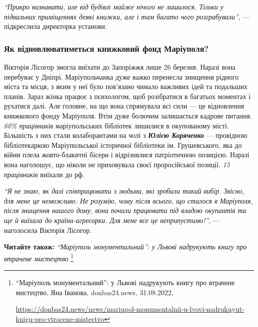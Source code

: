 \begin{leftbar}
\emph{\enquote{Прикро визнавати, але від будівлі майже нічого не лишилося. Тільки у
підвальних приміщеннях деякі книжки, але і там багато чого
розграбували}}, — підкреслила директорка установи.
\end{leftbar}


\subsubsection{Як відновлюватиметься книжковий фонд Маріуполя?}

Вікторія Лісогор змогла виїхати до Запоріжжя лише 26 березня. Наразі вона
перебуває у Дніпрі. Маріупольчанка дуже важко перенесла знищення рідного міста
та місця, з яким у неї було пов'язано чимало важливих ідей та подальших планів.
Зараз жінка працює з психологом, щоб розібратися в багатьох моментах і рухатися
далі. Але головне, на що вона спрямувала всі сили — це відновлення книжкового
фонду Маріуполя. Втім дуже болючим залишається кадрове питання. \emph{60\%
працівників} маріупольських бібліотек лишилися в окупованому місті. Більшість з
них стали колаборантами на чолі з \emph{\textbf{Юлією Коряченко}} — провідною бібліотекаркою
Маріупольської історичної бібліотеки ім. Грушевського, яка до війни плела
жовто-блакитні бісери і відрізнялися патріотичною позицією. Наразі вона
наголошує, що ніколи не приховувала своєї проросійської позиції. \emph{15 працівників}
виїхали до рф.


\begin{leftbar}
\emph{\enquote{Я не знаю, як далі співпрацювати з людьми, які зробили такий вибір. Звісно,
для мене це неможливо. Не розумію, чому після всього, що сталося в
Маріуполя, після знищення нашого дому, вони почали працювати під владою
окупантів та ще й виїхала до країни-агресорки. Для мене все це
неприпустимо!}}, — наголосила Вікторія Лісогор.
\end{leftbar}

\textbf{Читайте також:} \emph{\enquote{Маріуполь монументальний}: у Львові надрукують книгу про втрачене мистецтво}%
\footnote{\enquote{Маріуполь монументальний}: у Львові надрукують книгу про втрачене мистецтво, Яна Іванова, donbas24.news, 31.08.2022, \par%
\url{https://donbas24.news/news/mariupol-monumentalnii-u-lvovi-nadrukuyut-knigu-pro-vtracene-mistectvo}%
}

